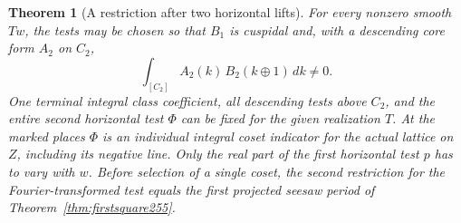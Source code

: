 \documentclass[a4paper,11pt]{article}
\newtheorem{theorem}[proposition]{Theorem}
\theoremstyle{definition}
\theoremstyle{remark}
\numberwithin{equation}{section}
\begin{document}
\begin{theorem}[A restriction after two horizontal lifts]\leavevmode
\label{thm:secondrow256}
For every nonzero smooth \(Tw\), the tests may be chosen so
that \(B_1\) is cuspidal and, with a descending core form
\(A_2\) on \(C_2\),
\[
            \int_{[C_2]} A_2(k)\,B_2(k\oplus1)\,dk\ne0 .
\]
One terminal integral class coefficient, all descending tests
above \(C_2\), and the entire second horizontal test \(\Phi\)
can be fixed for the given realization \(T\). At the marked
places \(\Phi\) is an individual integral coset indicator for
the actual lattice on \(Z\), including its negative line. Only
the real part of the first horizontal test \(p\) has to vary
with \(w\). Before selection of a single coset, the second
restriction for the Fourier-transformed test equals the
first projected seesaw period of Theorem~\ref{thm:firstsquare255}.
\end{theorem}
\end{document}
